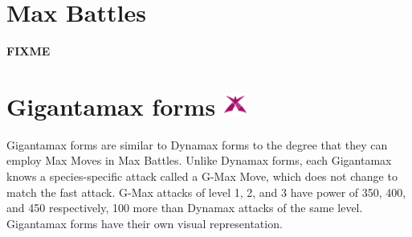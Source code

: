 \section{Max Battles}
\label{section:maxbattles}
\textbf{FIXME}

\section{Gigantamax forms \includegraphics[width=1em,height=1em]{images/gigantamax.png}}
\label{section:gmax}
Gigantamax forms are similar to Dynamax forms to the degree that they can
  employ Max Moves in Max Battles.
Unlike Dynamax forms, each Gigantamax knows a species-specific attack
  called a G-Max Move, which does not change to match the fast attack.
G-Max attacks of level 1, 2, and 3 have power of 350, 400, and 450
  respectively, 100 more than Dynamax attacks of the same level.
Gigantamax forms have their own visual representation.

